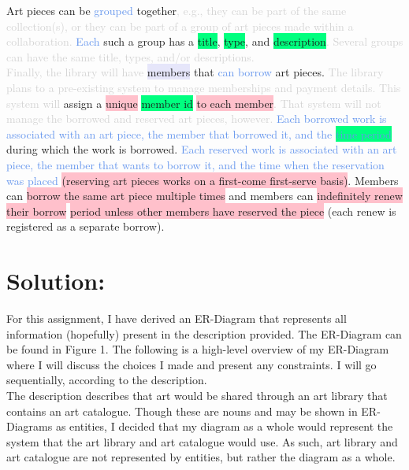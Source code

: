 \documentclass[11pt]{article}
\begin{document}
Art pieces can be \textcolor{CornflowerBlue}{grouped} together\textcolor{lightgray}{, e.g., they can be part of the same collection(s), or they can be part of a group of art pieces made within a collaboration.} \textcolor{CornflowerBlue}{Each} such a group has a \colorbox{SpringGreen}{title}, \colorbox{SpringGreen}{type}, and \colorbox{SpringGreen}{description}\textcolor{lightgray}{. Several groups can have the same title, types, and/or descriptions.} \\

\textcolor{lightgray}{Finally, the library will have} \colorbox{Lavender}{members} that \textcolor{CornflowerBlue}{can borrow} art pieces. \textcolor{lightgray}{The library plans to a pre-existing system to manage memberships and payment details. This system will} assign a \colorbox{pink}{unique} \colorbox{SpringGreen}{member id} \colorbox{pink}{to each member}\textcolor{lightgray}{. That system will not manage the borrowed and reserved art pieces, however.} \textcolor{CornflowerBlue}{Each borrowed work is associated with an art piece, the member that borrowed it, and the} \colorbox{SpringGreen}{\textcolor{CornflowerBlue}{time period}} during which the work is borrowed. \textcolor{CornflowerBlue}{Each reserved work is associated with an art piece, the member that wants to borrow it, and the time when the reservation was placed} \colorbox{pink}{(reserving art pieces works on a first-come first-serve basis)}. Members can \colorbox{pink}{borrow the same art piece multiple times} and members can \colorbox{pink}{indefinitely renew their borrow} \colorbox{pink}{period unless other members have reserved the piece} (each renew is registered as a separate borrow).

\newpage

\section*{Solution:}

For this assignment, I have derived an ER-Diagram that represents all information (hopefully) present in the description provided. The ER-Diagram can be found in Figure 1. The following is a high-level overview of my ER-Diagram where I will discuss the choices I made and present any constraints. I will go sequentially, according to the description. \\

The description describes that art would be shared through an art library that contains an art catalogue. Though these are nouns and may be shown in ER-Diagrams as entities, I decided that my diagram as a whole would represent the system that the art library and art catalogue would use. As such, art library and art catalogue are not represented by entities, but rather the diagram as a whole. \\
\end{document}
